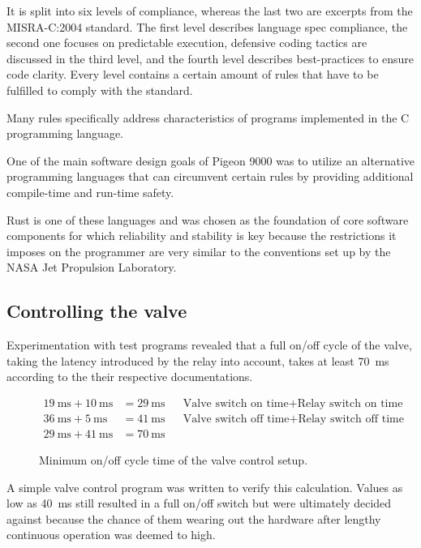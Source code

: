 It is split into six levels of compliance, whereas the last two are excerpts from the MISRA-C:2004 standard. The first level describes language spec compliance, the second one focuses on predictable execution, defensive coding tactics are discussed in the third level, and the fourth level describes best-practices to ensure code clarity. Every level contains a certain amount of rules that have to be fulfilled to comply with the standard.

Many rules specifically address characteristics of programs implemented in the C programming language.

One of the main software design goals of Pigeon 9000 was to utilize an alternative programming languages that can circumvent certain rules by providing additional compile-time and run-time safety. 

Rust \cite{rust} is one of these languages and was chosen as the foundation of core software components for which reliability and stability is key because the restrictions it imposes on the programmer are very similar to the conventions set up by the NASA Jet Propulsion Laboratory. 


\subsection{Controlling the valve}
Experimentation with test programs revealed that a full on/off cycle of the valve, taking the latency introduced by the relay into account, takes at least \SI{70}{\milli\second} according to the their respective documentations. 
\begin{figure}[h]
\begin{align*}
    \SI{19}{\milli\second} + \SI{10}{\milli\second} &=\SI{29}{\milli\second} && \text{Valve switch on time} + \text{Relay switch on time} \\
    \SI{36}{\milli\second} + \SI{5}{\milli\second}  &=\SI{41}{\milli\second} && \text{Valve switch off time} + \text{Relay switch off time}\\
    \SI{29}{\milli\second} + \SI{41}{\milli\second} &=\SI{70}{\milli\second} 
\end{align*}
\caption{Minimum on/off cycle time of the valve control setup.}
\end{figure}

A simple valve control program was written to verify this calculation. Values as low as \SI{40}{\milli\second} still resulted in a full on/off switch but were ultimately decided against because the chance of them wearing out the hardware after lengthy continuous operation was deemed to high.

